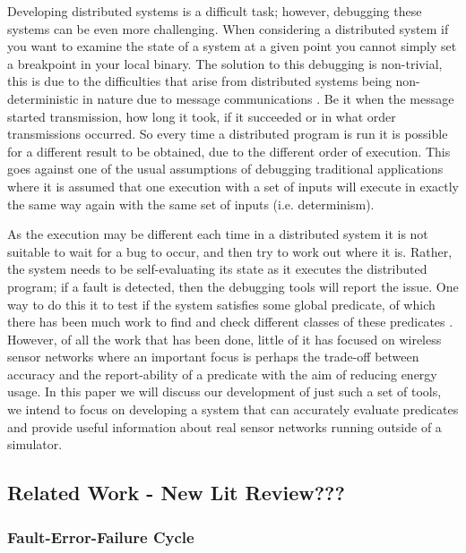 Developing distributed systems is a difficult task; however, debugging these systems can be even more challenging\cite{345131}. When considering a distributed system if you want to examine the state of a system at a given point you cannot simply set a breakpoint in your local binary. The solution to this debugging is non-trivial, this is due to the difficulties that arise from distributed systems being non-deterministic in nature due to message communications \cite{?}. Be it when the message started transmission, how long it took, if it succeeded or in what order transmissions occurred. So every time a distributed program is run it is possible for a different result to be obtained, due to the different order of execution. This goes against one of the usual assumptions of debugging traditional applications where it is assumed that one execution with a set of inputs will execute in exactly the same way again with the same set of inputs\cite{?} (i.e. determinism).

As the execution may be different each time in a distributed system it is not suitable to wait for a bug to occur, and then try to work out where it is. Rather, the system needs to be self-evaluating its state as it executes the distributed program; if a fault is detected, then the debugging tools will report the issue. One way to do this it to test if the system satisfies some global predicate, of which there has been much work to find and check different classes of these predicates \cite{553309,345831,277788}. However, of all the work that has been done, little of it has focused on wireless sensor networks where an important focus is perhaps the trade-off between accuracy and the report-ability of a predicate with the aim of reducing energy usage. In this paper we will discuss our development of just such a set of tools, we intend to focus on developing a system that can accurately evaluate predicates and provide useful information about real sensor networks running outside of a simulator.

\subsection{Related Work - New Lit Review???}

\subsubsection*{Fault-Error-Failure Cycle}

